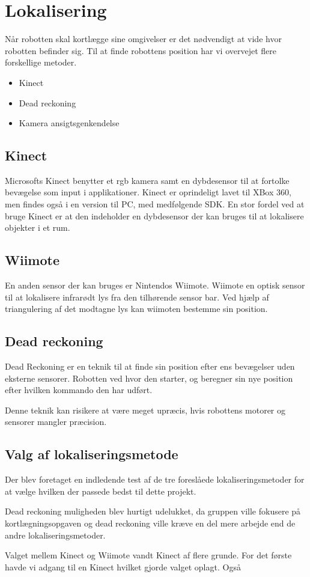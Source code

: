 \section{Lokalisering}
Når robotten skal kortlægge sine omgivelser er det nødvendigt at vide hvor robotten befinder sig.
Til at finde robottens position har vi overvejet flere forskellige metoder.
\begin{itemize}
\item Kinect
\item Dead reckoning
\item Kamera ansigtsgenkendelse
\end{itemize}

\subsection{Kinect }
Microsofts Kinect benytter et rgb kamera samt en dybdesensor til at fortolke bevægelse som input i applikationer.
Kinect er oprindeligt lavet til XBox 360, men findes også i en version til PC, med medfølgende SDK.
En stor fordel ved at bruge Kinect er at den indeholder en dybdesensor der kan bruges til at lokalisere objekter i et rum.

\subsection{Wiimote}
En anden sensor der kan bruges er Nintendos Wiimote. 
Wiimote en optisk sensor til at lokalisere infrarødt lys fra den tilhørende sensor bar.
Ved hjælp af triangulering af det modtagne lys kan wiimoten bestemme sin position.

\subsection{Dead reckoning}
Dead Reckoning er en teknik til at finde sin position efter ens bevægelser uden eksterne sensorer.
Robotten ved hvor den starter, og beregner sin nye position efter hvilken kommando den har udført.\cite{deadrec}

Denne teknik kan risikere at være meget upræcis, hvis robottens motorer og sensorer mangler præcision.

\subsection{Valg af lokaliseringsmetode}
Der blev foretaget en indledende test af de tre foreslåede lokaliseringsmetoder for at vælge hvilken der passede bedst til dette projekt.

Dead reckoning muligheden blev hurtigt udelukket, da gruppen ville fokusere på kortlægningsopgaven og dead reckoning ville kræve en del mere arbejde end de andre lokaliseringsmetoder.

Valget mellem Kinect og Wiimote vandt Kinect af flere grunde. 
For det første havde vi adgang til en Kinect hvilket gjorde valget oplagt. 
Også 